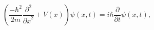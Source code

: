\[\left(\frac{-\hbar^{2}}{2m}\frac{{\partial}^{2}}{{\partial x}^{2}}+V(x)\right)%
\psi(x,t)=i\hbar\frac{\partial}{\partial t}\psi(x,t),\]